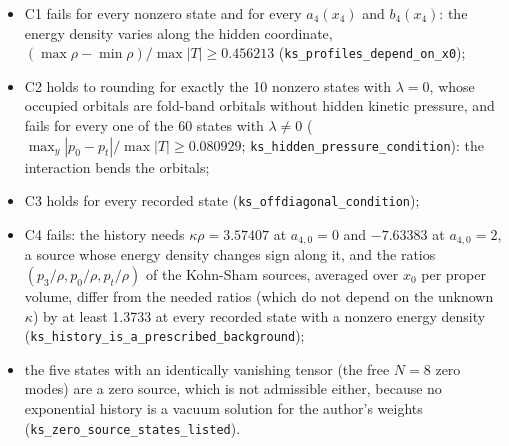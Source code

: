 \documentclass[11pt]{article}
\begin{document}
\begin{itemize}
\item C1 fails for every nonzero state and for every $a_4(x_4)$ and $b_4(x_4)$: the energy density varies along the hidden coordinate, $(\max\rho - \min\rho)/\max|T| \geq 0.456213$ (\texttt{ks\_profi\allowbreak{}les\_depe\allowbreak{}nd\_on\_x0});
\item C2 holds to rounding for exactly the 10 nonzero states with $\lambda = 0$, whose occupied orbitals are fold-band orbitals without hidden kinetic pressure, and fails for every one of the 60 states with $\lambda \neq 0$ ($\max_y|p_0 - p_t|/\max|T| \geq 0.080929$; \texttt{ks\_hidde\allowbreak{}n\_pressu\allowbreak{}re\_condi\allowbreak{}tion}): the interaction bends the orbitals;
\item C3 holds for every recorded state (\texttt{ks\_offdi\allowbreak{}agonal\_c\allowbreak{}ondition});
\item C4 fails: the history needs $\kappa\rho = 3.57407$ at $a_{4,0} = 0$ and $-7.63383$ at $a_{4,0} = 2$, a source whose energy density changes sign along it, and the ratios $(p_3/\rho, p_0/\rho, p_t/\rho)$ of the Kohn-Sham sources, averaged over $x_0$ per proper volume, differ from the needed ratios (which do not depend on the unknown $\kappa$) by at least 1.3733 at every recorded state with a nonzero energy density (\texttt{ks\_histo\allowbreak{}ry\_is\_a\_\allowbreak{}prescrib\allowbreak{}ed\_backg\allowbreak{}round});
\item the five states with an identically vanishing tensor (the free $N = 8$ zero modes) are a zero source, which is not admissible either, because no exponential history is a vacuum solution for the author's weights (\texttt{ks\_zero\_\allowbreak{}source\_s\allowbreak{}tates\_li\allowbreak{}sted}).
\end{itemize}
\end{document}

